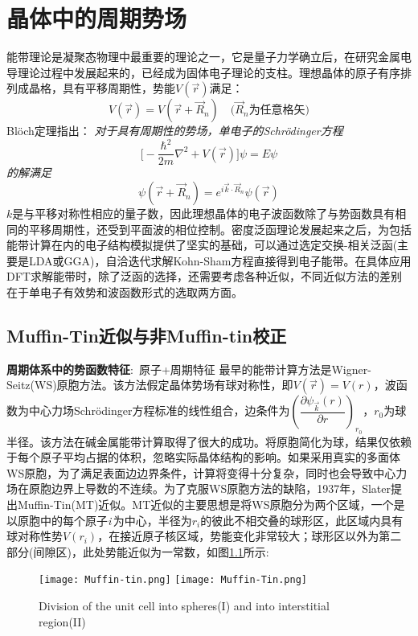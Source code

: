 \chapter{晶体中的周期势场}
能带理论是凝聚态物理中最重要的理论之一，它是量子力学确立后，在研究金属电导理论过程中发展起来的，已经成为固体电子理论的支柱。理想晶体的原子有序排列成晶格，具有平移周期性，势能$V(\vec r)$满足：
\begin{equation}\label{eq:solid-2}
	V(\vec r)=V(\vec r+\vec R_n)\quad\mbox{($\vec R_n$为任意格矢)}
\end{equation}
\textrm{Bl\"och}定理指出：
{\it 对于具有周期性的势场，单电子的Schr\"odinger方程}
\begin{equation}\label{eq:solid-1}
  \biggl[-\dfrac{\hbar^2}{2m}\nabla^2+V(\vec r)\biggr]\psi=E\psi
\end{equation}
{\it 的解满足}
\begin{equation}
  \psi(\vec r+\vec R_n)=e^{i\vec k\cdot\vec R_n}\psi(\vec r)
  \label{eq:bloch}
\end{equation}
$k$是与平移对称性相应的量子数，因此理想晶体的电子波函数除了与势函数具有相同的平移周期性，还受到平面波的相位控制。密度泛函理论发展起来之后，为包括能带计算在内的电子结构模拟提供了坚实的基础，可以通过选定交换-相关泛函(主要是LDA或GGA)，自洽迭代求解Kohn-Sham方程直接得到电子能带。在具体应用DFT求解能带时，除了泛函的选择，还需要考虑各种近似，不同近似方法的差别在于单电子有效势和波函数形式的选取两方面。

\section{Muffin-Tin近似与非Muffin-tin校正}
\textbf{周期体系中的势函数特征}:~原子+周期特征
最早的能带计算方法是Wigner-Seitz(WS)原胞方法\cite{PR43-804_1933}。该方法假定晶体势场有球对称性，即$V(\vec r)=V(r)$，波函数为中心力场Schr\"odinger方程标准的线性组合，边条件为$\left(\dfrac{\partial\psi_{\vec k}(r)}{\partial r}\right)_{r_0}$，$r_0$为球半径。该方法在碱金属能带计算取得了很大的成功。将原胞简化为球，结果仅依赖于每个原子平均占据的体积，忽略实际晶体结构的影响。如果采用真实的多面体WS原胞，为了满足表面边边界条件，计算将变得十分复杂，同时也会导致中心力场在原胞边界上导数的不连续。为了克服WS原胞方法的缺陷，1937年，Slater提出Muffin-Tin(MT)近似\cite{PR51-846_1937}。MT近似的主要思想是将WS原胞分为两个区域，一个是以原胞中的每个原子{\it i}\,为中心，半径为$r_i$的彼此不相交叠的球形区，此区域内具有球对称性势$V(r_i)$，在接近原子核区域，势能变化非常较大；球形区以外为第二部分(间隙区)，此处势能近似为一常数，如图\ref{Muffin_tin-1}所示:
\begin{figure}[h!]
\centering
\texttt{[image: Muffin-tin.png]}
\texttt{[image: Muffin-Tin.png]}
\caption{\small \textrm{Division of the unit cell into spheres(I) and into interstitial region(II)}}%
\label{Muffin_tin-1}
\end{figure}

